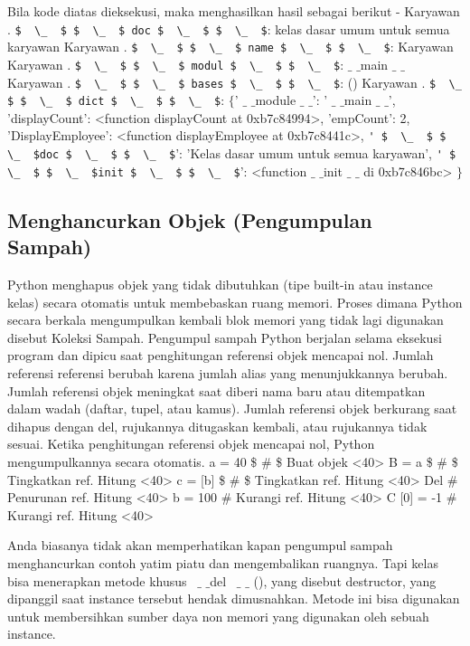 Bila kode diatas dieksekusi, maka menghasilkan hasil sebagai berikut -
Karyawan . \verb|$  \_  $ $  \_  $ doc $  \_  $ $  \_  $|: kelas dasar umum untuk semua karyawan
Karyawan . \verb|$  \_  $ $  \_  $ name $  \_  $ $  \_  $|: Karyawan
Karyawan . \verb|$  \_  $ $  \_  $ modul $  \_  $ $  \_  $|:  $  \_  $ $  \_  $main $  \_  $ $  \_  $
Karyawan . \verb|$  \_  $ $  \_  $ bases $  \_  $ $  \_  $|: ()
Karyawan . \verb|$  \_  $ $  \_  $ dict $  \_  $ $  \_  $|:  $  \{  $' $  \_  $ $  \_  $module $  \_  $ $  \_  $': ' $  \_  $ $  \_  $main $  \_  $ $  \_  $', 'displayCount':
<function displayCount at 0xb7c84994>, 'empCount': 2,
'DisplayEmployee': <function displayEmployee at 0xb7c8441c>,
\verb|' $  \_  $ $  \_  $doc $  \_  $ $  \_  $|': 'Kelas dasar umum untuk semua karyawan',
\verb|' $  \_  $ $  \_  $init $  \_  $ $  \_  $|': <function  $  \_  $ $  \_  $init $  \_  $ $  \_  $ di 0xb7c846bc> $  \}  $ \par

\subsection{Menghancurkan Objek (Pengumpulan Sampah)}
Python menghapus objek yang tidak dibutuhkan (tipe built-in atau instance kelas) secara otomatis untuk membebaskan ruang memori. Proses dimana Python secara berkala mengumpulkan kembali blok memori yang tidak lagi digunakan disebut Koleksi Sampah. Pengumpul sampah Python berjalan selama eksekusi program dan dipicu saat penghitungan referensi objek mencapai nol. Jumlah referensi referensi berubah karena jumlah alias yang menunjukkannya berubah. Jumlah referensi objek meningkat saat diberi nama baru atau ditempatkan dalam wadah (daftar, tupel, atau kamus). Jumlah referensi objek berkurang saat dihapus dengan del, rujukannya ditugaskan kembali, atau rujukannya tidak sesuai. Ketika penghitungan referensi objek mencapai nol, Python mengumpulkannya secara otomatis.
a = 40  \$  \#  \$ Buat objek <40>
B = a  \$  \#  \$ Tingkatkan ref. Hitung <40>
c = [b]  \$  \#  \$ Tingkatkan ref. Hitung <40>
Del  $  \#  $ Penurunan ref. Hitung <40>
b = 100  $  \#  $ Kurangi ref. Hitung <40>
C [0] = -1  $  \#  $ Kurangi ref. Hitung <40>

Anda biasanya tidak akan memperhatikan kapan pengumpul sampah menghancurkan contoh yatim piatu dan mengembalikan ruangnya. Tapi kelas bisa menerapkan metode khusus  $  \_  $ $  \_  $del  $  \_  $ $  \_ $ (), yang disebut destructor, yang dipanggil saat instance tersebut hendak dimusnahkan. Metode ini bisa digunakan untuk membersihkan sumber daya non memori yang digunakan oleh sebuah instance. \par

